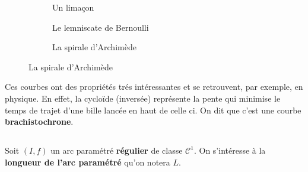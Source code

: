 \begin{figure}[h]
\begin{subfigure}{.3\textwidth}
      \caption*{Un limaçon}
   \end{subfigure}\quad
   \begin{subfigure}{.3\textwidth}
      \centering
      \caption*{Le lemniscate de Bernoulli}
   \end{subfigure}\quad
   \begin{subfigure}{.3\textwidth}
      \centering
      \caption*{La spirale d'Archimède}
   \end{subfigure}\quad
\end{figure}

Ces courbes ont des propriétés trés intéressantes et se retrouvent, par exemple, en physique. En effet, la cycloïde (inversée) représente la pente qui minimise le temps de trajet d'une bille lancée en haut de celle ci. On dit que c'est une courbe \textbf{brachistochrone}.

\subsection*{}
Soit \((I, f)\) un arc paramétré \textbf{régulier} de classe \(\mathcal{C}^1\). On s'intéresse à la \textbf{longueur de l'arc paramétré} qu'on notera \(L\).\<

